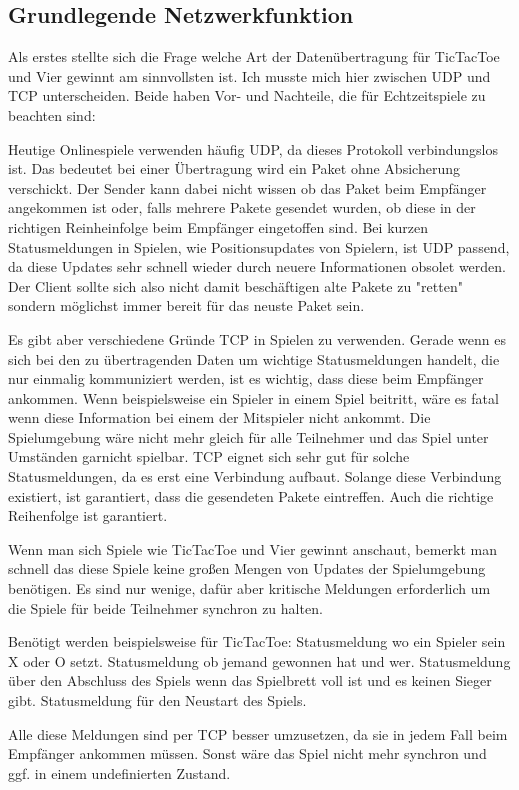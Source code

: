 \subsection{Grundlegende Netzwerkfunktion}
Als erstes stellte sich die Frage welche Art der Datenübertragung für TicTacToe und Vier gewinnt am sinnvollsten ist.
Ich musste mich hier zwischen UDP und TCP unterscheiden. Beide haben Vor- und Nachteile, die für Echtzeitspiele zu beachten sind:
\par
Heutige Onlinespiele verwenden häufig UDP, da dieses Protokoll verbindungslos ist.
Das bedeutet bei einer Übertragung wird ein Paket ohne Absicherung verschickt. Der Sender kann dabei nicht wissen ob das Paket
beim Empfänger angekommen ist oder, falls mehrere Pakete gesendet wurden, ob diese in der richtigen Reinheinfolge beim Empfänger
eingetoffen sind.
Bei kurzen Statusmeldungen in Spielen, wie Positionsupdates von Spielern, ist UDP passend, da diese Updates sehr schnell wieder
durch neuere Informationen obsolet werden. Der Client sollte sich also nicht damit beschäftigen alte Pakete zu "retten" sondern
möglichst immer bereit für das neuste Paket sein.
\par
Es gibt aber verschiedene Gründe TCP in Spielen zu verwenden.
Gerade wenn es sich bei den zu übertragenden Daten um wichtige Statusmeldungen handelt, die nur einmalig kommuniziert werden,
ist es wichtig, dass diese beim Empfänger ankommen. Wenn beispielsweise ein Spieler in einem Spiel beitritt, wäre es fatal
wenn diese Information bei einem der Mitspieler nicht ankommt. Die Spielumgebung wäre nicht mehr gleich für alle Teilnehmer
und das Spiel unter Umständen garnicht spielbar. TCP eignet sich sehr gut für solche Statusmeldungen, da es erst eine Verbindung aufbaut.
Solange diese Verbindung existiert, ist garantiert, dass die gesendeten Pakete eintreffen. Auch die richtige Reihenfolge ist garantiert.
\par
Wenn man sich Spiele wie TicTacToe und Vier gewinnt anschaut, bemerkt man schnell das diese Spiele keine großen Mengen von Updates
der Spielumgebung benötigen. Es sind nur wenige, dafür aber kritische Meldungen erforderlich um die Spiele für beide Teilnehmer
synchron zu halten.
\par
Benötigt werden beispielsweise für TicTacToe:
\newline
Statusmeldung wo ein Spieler sein X oder O setzt.
\newline
Statusmeldung ob jemand gewonnen hat und wer.
\newline
Statusmeldung über den Abschluss des Spiels wenn das Spielbrett voll ist und es keinen Sieger gibt.
\newline
Statusmeldung für den Neustart des Spiels.
\par
Alle diese Meldungen sind per TCP besser umzusetzen, da sie in jedem Fall beim Empfänger ankommen müssen. Sonst wäre das Spiel
nicht mehr synchron und ggf. in einem undefinierten Zustand.
